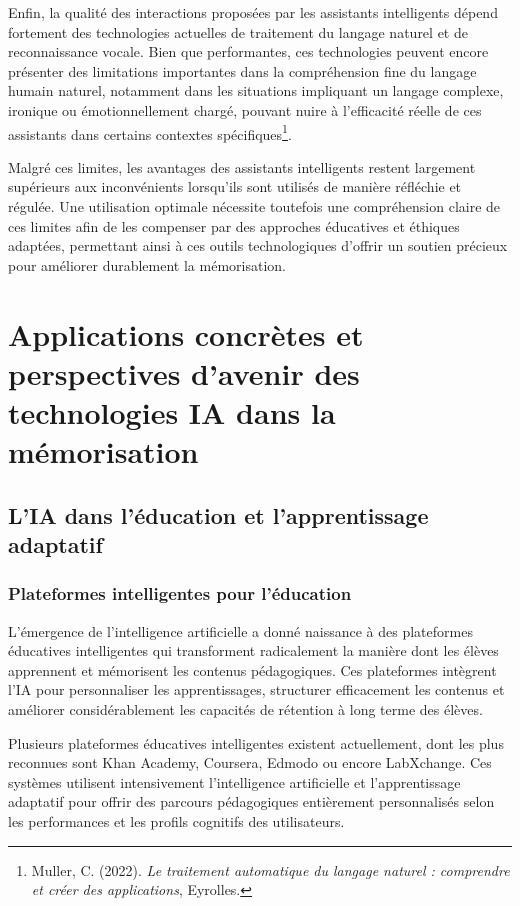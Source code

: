 \documentclass[12pt,a4paper]{report}
\begin{document}
Enfin, la qualité des interactions proposées par les assistants intelligents dépend fortement des technologies actuelles de traitement du langage naturel et de reconnaissance vocale. Bien que performantes, ces technologies peuvent encore présenter des limitations importantes dans la compréhension fine du langage humain naturel, notamment dans les situations impliquant un langage complexe, ironique ou émotionnellement chargé, pouvant nuire à l'efficacité réelle de ces assistants dans certains contextes spécifiques\footnote{Muller, C. (2022). \textit{Le traitement automatique du langage naturel : comprendre et créer des applications}, Eyrolles.}.

Malgré ces limites, les avantages des assistants intelligents restent largement supérieurs aux inconvénients lorsqu'ils sont utilisés de manière réfléchie et régulée. Une utilisation optimale nécessite toutefois une compréhension claire de ces limites afin de les compenser par des approches éducatives et éthiques adaptées, permettant ainsi à ces outils technologiques d’offrir un soutien précieux pour améliorer durablement la mémorisation.

\chapter{Applications concrètes et perspectives d’avenir des technologies IA dans la mémorisation}

\section{L’IA dans l’éducation et l’apprentissage adaptatif}

\subsection{Plateformes intelligentes pour l’éducation}

L’émergence de l’intelligence artificielle a donné naissance à des plateformes éducatives intelligentes qui transforment radicalement la manière dont les élèves apprennent et mémorisent les contenus pédagogiques. Ces plateformes intègrent l’IA pour personnaliser les apprentissages, structurer efficacement les contenus et améliorer considérablement les capacités de rétention à long terme des élèves.

Plusieurs plateformes éducatives intelligentes existent actuellement, dont les plus reconnues sont Khan Academy, Coursera, Edmodo ou encore LabXchange. Ces systèmes utilisent intensivement l’intelligence artificielle et l’apprentissage adaptatif pour offrir des parcours pédagogiques entièrement personnalisés selon les performances et les profils cognitifs des utilisateurs.
\end{document}
